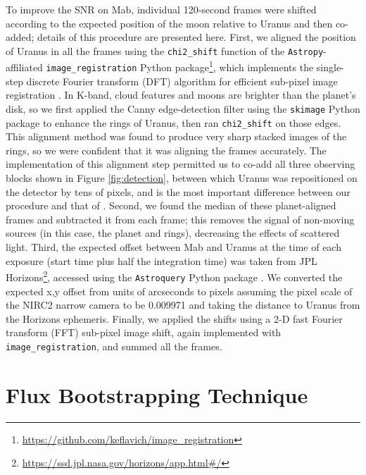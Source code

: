 \documentclass[preprint]{aastex631}
\begin{document}
To improve the SNR on Mab, individual 120-second frames were shifted according to the expected position of the moon relative to Uranus and then co-added; details of this procedure are presented here. First, we aligned the position of Uranus in all the frames using the \texttt{chi2\_shift} function of the \texttt{Astropy}-affiliated \texttt{image\_registration} Python package\footnote{\url{https://github.com/keflavich/image_registration}}, which implements the single-step discrete Fourier transform (DFT) algorithm for efficient sub-pixel image registration \citep{guizarsicairos08}. In K-band, cloud features and moons are brighter than the planet's disk, so we first applied the Canny edge-detection filter using the \texttt{skimage} Python package \citep{skimage14} to enhance the rings of Uranus, then ran \texttt{chi2\_shift} on those edges. This alignment method was found to produce very sharp stacked images of the rings, so we were confident that it was aligning the frames accurately. The implementation of this alignment step permitted us to co-add all three observing blocks shown in Figure \ref{fig:detection}, between which Uranus was repositioned on the detector by tens of pixels, and is the most important difference between our procedure and that of \citet{paradis19, paradis23}.  Second, we found the median of these planet-aligned frames and subtracted it from each frame; this removes the signal of non-moving sources (in this case, the planet and rings), decreasing the effects of scattered light. Third, the expected offset between Mab and Uranus at the time of each exposure (start time plus half the integration time) was taken from JPL Horizons\footnote{\url{https://ssd.jpl.nasa.gov/horizons/app.html\#/}}, accessed using the \texttt{Astroquery} Python package \citep{ginsburg19}. We converted the expected x,y offset from units of arcseconds to pixels assuming the pixel scale of the NIRC2 narrow camera to be 0.009971\arcsec \citep{service16} and taking the distance to Uranus from the Horizons ephemeris. Finally, we applied the shifts using a 2-D fast Fourier transform (FFT) sub-pixel image shift, again implemented with \texttt{image\_registration}, and summed all the frames.


\section{Flux Bootstrapping Technique}
\label{s:bootstrapping}
\end{document}

